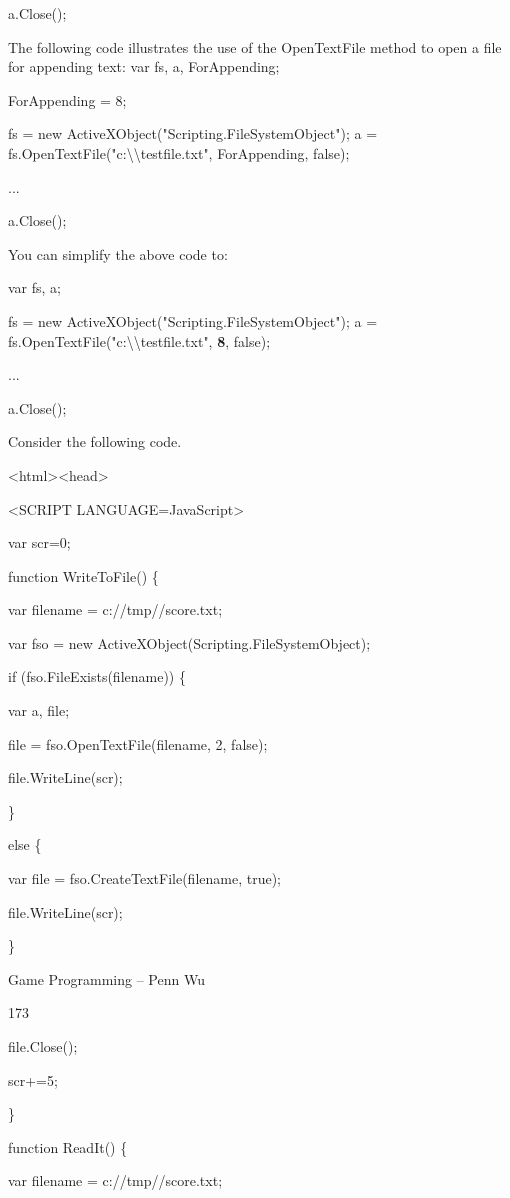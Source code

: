 \documentclass[
]{article}
\begin{document}
a.Close();

The following code illustrates the use of the OpenTextFile method to
open a file for appending text: var fs, a, ForAppending;

ForAppending = 8;

fs = new ActiveXObject("Scripting.FileSystemObject"); a =
fs.OpenTextFile("c:\textbackslash\textbackslash testfile.txt",
ForAppending, false);

...

a.Close();

You can simplify the above code to:

var fs, a;

fs = new ActiveXObject("Scripting.FileSystemObject"); a =
fs.OpenTextFile("c:\textbackslash\textbackslash testfile.txt",
\textbf{8}, false);

...

a.Close();

Consider the following code.

\textless html\textgreater\textless head\textgreater{}

\textless SCRIPT
LANGUAGE=\textquotesingle JavaScript\textquotesingle\textgreater{}

var scr=0;

function WriteToFile() \{

var filename = \textquotesingle c://tmp//score.txt\textquotesingle;

var fso = new
ActiveXObject(\textquotesingle Scripting.FileSystemObject\textquotesingle);

if (fso.FileExists(filename)) \{

var a, file;

file = fso.OpenTextFile(filename, 2, false);

file.WriteLine(scr);

\}

else \{

var file = fso.CreateTextFile(filename, true);

file.WriteLine(scr);

\}

Game Programming -- Penn Wu

173

\protect\hypertarget{index_split_011.htmlux5cux23p174}{}{} file.Close();

scr+=5;

\}

function ReadIt() \{

var filename = \textquotesingle c://tmp//score.txt\textquotesingle;
\end{document}
